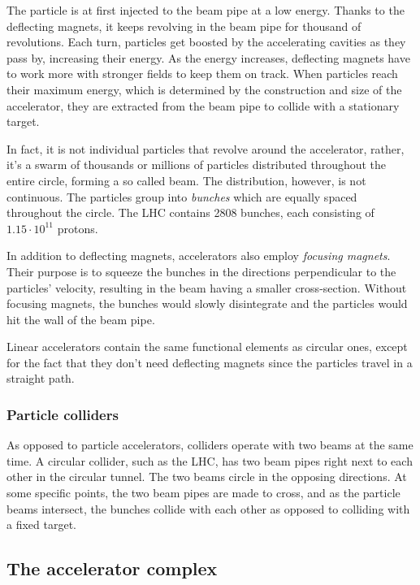 \documentclass[12pt]{article}
\begin{document}
The particle is at first injected to the beam pipe at a low energy. Thanks to the deflecting magnets, it keeps revolving in the beam pipe for thousand of revolutions. Each turn, particles get boosted by the accelerating cavities as they pass by, increasing their energy. As the energy increases, deflecting magnets have to work more with stronger fields to keep them on track. When particles reach their maximum energy, which is determined by the construction and size of the accelerator, they are extracted from the beam pipe to collide with a stationary target.

In fact, it is not individual particles that revolve around the accelerator, rather, it's a swarm of thousands or millions of particles distributed throughout the entire circle, forming a so called beam. The distribution, however, is not continuous. The particles group into \textit{bunches} which are equally spaced throughout the circle. The LHC contains 2808 bunches, each consisting of $1.15\cdot10^{11}$ protons.

In addition to deflecting magnets, accelerators also employ \textit{focusing magnets}. Their purpose is to squeeze the bunches in the directions perpendicular to the particles' velocity, resulting in the beam having a smaller cross-section. Without focusing magnets, the bunches would slowly disintegrate and the particles would hit the wall of the beam pipe.

Linear accelerators contain the same functional elements as circular ones, except for the fact that they don't need deflecting magnets since the particles travel in a straight path.


\subsubsection{Particle colliders}\label{sec_part_collider}

As opposed to particle accelerators, colliders operate with two beams at the same time. A circular collider, such as the LHC, has two beam pipes right next to each other in the circular tunnel. The two beams circle in the opposing directions. At some specific points, the two beam pipes are made to cross, and as the particle beams intersect, the bunches collide with each other as opposed to colliding with a fixed target.


\subsection{The accelerator complex}\label{sec_accel_complex}
\end{document}
